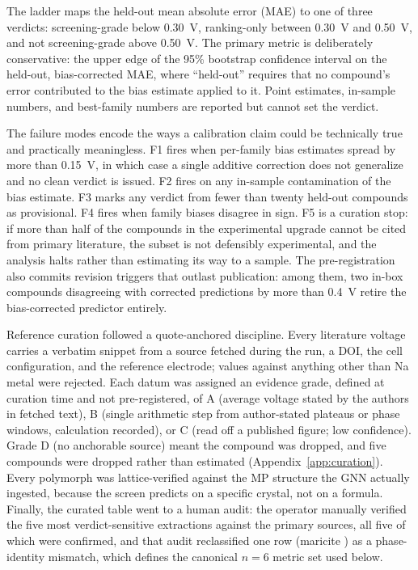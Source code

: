 \documentclass[reprint,aps,prb,amsmath,amssymb,nofootinbib,longbibliography]{revtex4-2}
\begin{document}
The ladder maps the held-out mean absolute error (MAE) to one of three
verdicts: screening-grade below \SI{0.30}{\volt}, ranking-only between
\SI{0.30}{\volt} and \SI{0.50}{\volt}, and not screening-grade above
\SI{0.50}{\volt}. The primary metric is deliberately conservative: the upper
edge of the 95\% bootstrap confidence interval on the held-out, bias-corrected
MAE, where ``held-out'' requires that no compound's error contributed to the
bias estimate applied to it. Point estimates, in-sample numbers, and
best-family numbers are reported but cannot set the verdict.

The failure modes encode the ways a calibration claim could be technically
true and practically meaningless. F1 fires when per-family bias estimates
spread by more than \SI{0.15}{\volt}, in which case a single additive
correction does not generalize and no clean verdict is issued. F2 fires on
any in-sample contamination of the bias estimate. F3 marks any verdict from
fewer than twenty held-out compounds as provisional. F4 fires when family
biases disagree in sign. F5 is a curation stop: if more than half of the
compounds in the experimental upgrade cannot be cited from primary literature,
the subset is not defensibly experimental, and the analysis halts rather than
estimating its way to a sample. The pre-registration also commits revision
triggers that outlast publication: among them, two in-box compounds
disagreeing with corrected predictions by more than \SI{0.4}{\volt} retire the
bias-corrected predictor entirely.

Reference curation followed a quote-anchored discipline. Every literature
voltage carries a verbatim snippet from a source fetched during the run,
a DOI, the cell configuration, and the reference electrode; values against
anything other than Na metal were rejected. Each datum was assigned an
evidence grade, defined at curation time and not pre-registered, of A
(average voltage stated by the authors in fetched text), B (single arithmetic
step from author-stated plateaus or phase windows, calculation recorded), or C
(read off a published figure; low confidence). Grade D (no anchorable source)
meant the compound was dropped, and five compounds were dropped rather than
estimated (Appendix~\ref{app:curation}). Every polymorph was lattice-verified
against the MP structure the GNN actually ingested, because the screen
predicts on a specific crystal, not on a formula. Finally, the curated table
went to a human audit: the operator manually verified the five
most verdict-sensitive extractions against the primary sources, all five of
which were confirmed, and that audit reclassified one row (maricite )
as a phase-identity mismatch, which defines the canonical $n=6$ metric set
used below.
\end{document}
